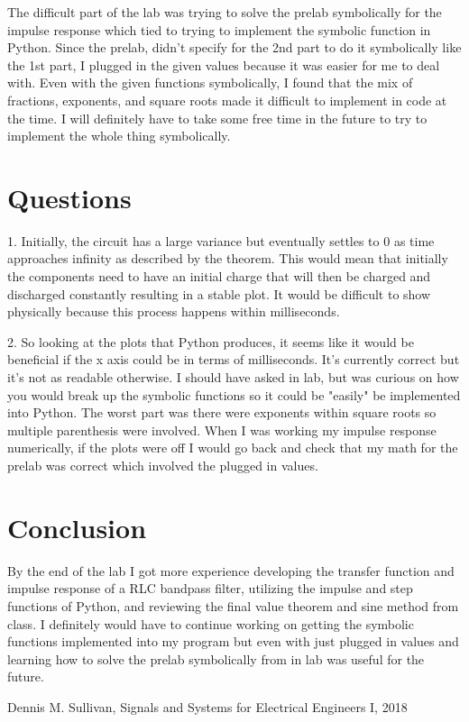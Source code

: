 \documentclass[12pt]{report}
\begin{document}
The difficult part of the lab was trying to solve the prelab symbolically for the impulse response which tied to trying to implement the symbolic function in Python. Since the prelab, didn't specify for the 2nd part to do it symbolically like the 1st part, I plugged in the given values because it was easier for me to deal with. Even with the given functions symbolically, I found that the mix of fractions, exponents, and square roots made it difficult to implement in code at the time. I will definitely have to take some free time in the future to try to implement the whole thing symbolically. 

\section{Questions}
1. Initially, the circuit has a large variance but eventually settles to 0 as time approaches infinity as described by the theorem. This would mean that initially the components need to have an initial charge that will then be charged and discharged constantly resulting in a stable plot. It would be difficult to show physically because this process happens within milliseconds.

2. So looking at the plots that Python produces, it seems like it would be beneficial if the x axis could be in terms of milliseconds. It's currently correct but it's not as readable otherwise. I should have asked in lab, but was curious on how you would break up the symbolic functions so it could be "easily" be implemented into Python. The worst part was there were exponents within square roots so multiple parenthesis were involved. When I was working my impulse response numerically, if the plots were off I would go back and check that my math for the prelab was correct which involved the plugged in values. 

\section{Conclusion}

By the end of the lab I got more experience developing the transfer function and impulse response of a RLC bandpass filter, utilizing the impulse and step functions of Python, and reviewing the final value theorem and sine method from class. I definitely would have to continue working on getting the symbolic functions implemented into my program but even with just plugged in values and learning how to solve the prelab symbolically from in lab was useful for the future. 

\newpage


\begin{thebibliography}{111}
Dennis M. Sullivan,
Signals and Systems for Electrical Engineers I,
 2018
\end{thebibliography}
\end{document}
